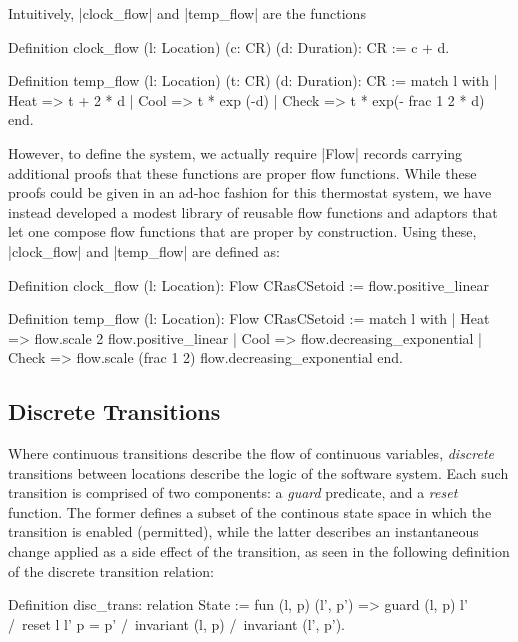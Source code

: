\documentclass[runningheads]{llncs}
\begin{document}
Intuitively, |clock_flow| and |temp_flow| are the functions
\begin{code}
Definition clock_flow (l: Location) (c: CR) (d: Duration): CR :=
  c + d.

Definition temp_flow (l: Location) (t: CR) (d: Duration): CR :=
  match l with
  | Heat => t + 2 * d
  | Cool => t * exp (-d)
  | Check => t * exp(- frac 1 2 * d)
  end.
\end{code}
However, to define the system, we actually require |Flow| records carrying additional proofs that these functions are proper flow functions. While these proofs could be given in an ad-hoc fashion for this thermostat system, we have instead developed a modest library of reusable flow functions and adaptors that let one compose flow functions that are proper by construction. Using these, |clock_flow| and |temp_flow| are defined as:
\begin{code}
Definition clock_flow (l: Location): Flow CRasCSetoid :=
  flow.positive_linear

Definition temp_flow (l: Location): Flow CRasCSetoid :=
  match l with
  | Heat => flow.scale 2 flow.positive_linear
  | Cool => flow.decreasing_exponential
  | Check => flow.scale (frac 1 2) flow.decreasing_exponential
  end.
\end{code}

\subsection{Discrete Transitions}
\label{conc.disc_trans}

Where continuous transitions describe the flow of continuous variables, \emph{discrete} transitions between locations describe the logic of the software system. Each such transition is comprised of two components: a \emph{guard} predicate, and a \emph{reset} function. The former defines a subset of the continous state space in which the transition is enabled (permitted), while the latter describes an instantaneous change applied as a side effect of the transition, as seen in the following definition of the discrete transition relation:

\begin{code}
  Definition disc_trans: relation State := fun (l, p) (l', p') =>
    guard (l, p) l' /\ reset l l' p = p' /\
    invariant (l, p) /\ invariant (l', p').
\end{code}

\end{document}
